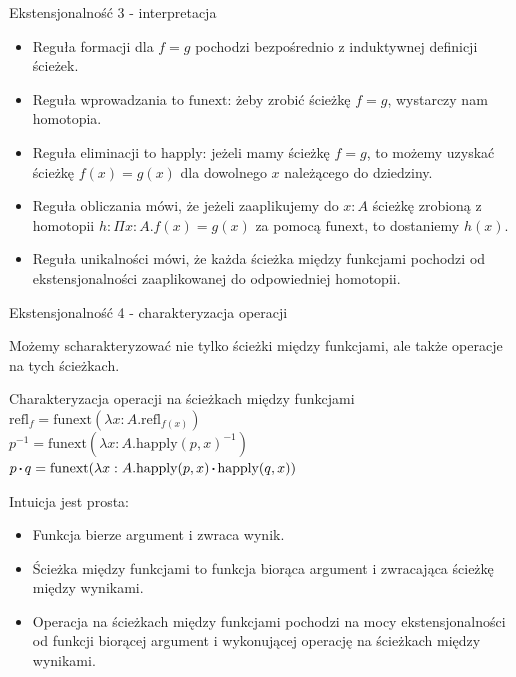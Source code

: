 \documentclass{beamer}
\newcommand{\refl}[1]{\text{refl}_{#1}}
\newcommand{\inv}[1]{#1^{-1}}
\newcommand{\sq}{\mathbin{\vcenter{\hbox{\rule{.3ex}{.3ex}}}}}
\newcommand{\happly}{\text{happly}}
\newcommand{\funext}{\text{funext}}
\begin{document}
\begin{frame}{Ekstensjonalność 3 - interpretacja}
\begin{itemize}
	\item Reguła formacji dla $f = g$ pochodzi bezpośrednio z induktywnej definicji ścieżek.
	\item Reguła wprowadzania to $\funext$: żeby zrobić ścieżkę $f = g$, wystarczy nam homotopia.
	\item Reguła eliminacji to $\happly$: jeżeli mamy ścieżkę $f = g$, to możemy uzyskać ścieżkę $f(x) = g(x)$ dla dowolnego $x$ należącego do dziedziny.
	\item Reguła obliczania mówi, że jeżeli zaaplikujemy do $x : A$ ścieżkę zrobioną z homotopii $h : \Pi x : A. f(x) = g(x)$ za pomocą $\funext$, to dostaniemy $h(x)$.
	\item Reguła unikalności mówi, że każda ścieżka między funkcjami pochodzi od ekstensjonalności zaaplikowanej do odpowiedniej homotopii.
\end{itemize}
\end{frame}

\begin{frame}{Ekstensjonalność 4 - charakteryzacja operacji}

Możemy scharakteryzować nie tylko ścieżki między funkcjami, ale także operacje na tych ścieżkach.

\begin{block}{Charakteryzacja operacji na ścieżkach między funkcjami}
$\refl{f} = \funext(\lambda x : A. \refl{f(x)})$ \\

$\inv{p} = \funext(\lambda x : A.\inv{\happly(p, x)})$ \\

$p \sq q = \funext(\lambda x : A. \happly(p, x) \sq \happly(q, x))$
\end{block}

Intuicja jest prosta:
\begin{itemize}
	\item Funkcja bierze argument i zwraca wynik.
	\item Ścieżka między funkcjami to funkcja biorąca argument i zwracająca ścieżkę między wynikami.
	\item Operacja na ścieżkach między funkcjami pochodzi na mocy ekstensjonalności od funkcji biorącej argument i wykonującej operację na ścieżkach między wynikami.
\end{itemize}

\end{frame}
\end{document}
